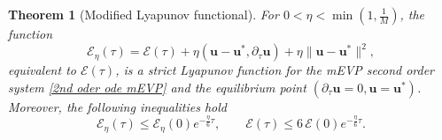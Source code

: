 \documentclass[11pt]{article}
\newtheorem{theorem}{Theorem}[section]
\newcommand{\bu}{\mathbf{u}}
\begin{document}
\begin{theorem}[Modified Lyapunov functional]
\label{lemma: modified Lyapunov}
    For $0< \eta <\min(1, \frac{1}{M}) $, the function 
    \begin{equation}
        \mathcal{E}_\eta(\tau) = \mathcal E(\tau)+\eta(\bu-\bu^*,\partial_\tau\bu)+\eta\|\bu-\bu^*\|^2,
    \end{equation}equivalent to $\mathcal{E}(\tau)$, is a strict Lyapunov function for the mEVP second order system \eqref{2nd oder ode mEVP} and the equilibrium point $(\partial_\tau \bu = 0, \bu = \bu^*)$. Moreover, the following inequalities hold
    \begin{equation}
        \mathcal{E}_\eta(\tau) \leq \mathcal{E}_\eta(0)e^{-\frac{\eta}{6}\tau}, \qquad \mathcal{E}(\tau)
\leq 6\, \mathcal{E}(0)e^{-\frac{\eta}{6}\tau}.
    \end{equation}
\end{theorem}
\end{document}
